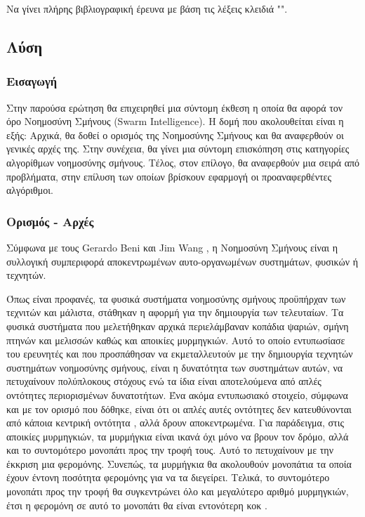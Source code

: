 \documentclass{assignment}
\begin{document}
Να γίνει πλήρης βιβλιογραφική έρευνα με βάση τις λέξεις κλειδιά "".

\subsection {Λύση}
\subsubsection*{Εισαγωγή}
Στην παρούσα ερώτηση θα επιχειρηθεί μια σύντομη έκθεση η οποία θα αφορά τον όρο
Νοημοσύνη Σμήνους (Swarm Intelligence). Η δομή που ακολουθείται είναι η
εξής: Αρχικά, θα δοθεί ο ορισμός της Νοημοσύνης Σμήνους και θα αναφερθούν οι
γενικές αρχές της. Στην συνέχεια, θα γίνει μια σύντομη επισκόπηση στις
κατηγορίες αλγορίθμων νοημοσύνης σμήνους. Τέλος, στον επίλογο, θα αναφερθούν
μια σειρά από προβλήματα, στην επίλυση των οποίων βρίσκουν εφαρμογή οι
προαναφερθέντες αλγόριθμοι.
\subsubsection*{Ορισμός - Αρχές}
Σύμφωνα με τους Gerardo Beni και Jim Wang \cite{beni1993swarm}, η Νοημοσύνη
Σμήνους είναι η συλλογική συμπεριφορά αποκεντρωμένων αυτο-οργανωμένων
συστημάτων, φυσικών ή τεχνητών.

Όπως είναι προφανές, τα φυσικά συστήματα νοημοσύνης σμήνους προϋπήρχαν των
τεχνιτών και μάλιστα, στάθηκαν η αφορμή για την δημιουργία των τελευταίων. Τα
φυσικά συστήματα που μελετήθηκαν αρχικά περιελάμβαναν κοπάδια ψαριών, σμήνη
πτηνών και μελισσών καθώς και αποικίες μυρμηγκιών. Αυτό το οποίο εντυπωσίασε
του ερευνητές και που προσπάθησαν να εκμεταλλευτούν με την δημιουργία τεχνητών
συστημάτων νοημοσύνης σμήνους, είναι η δυνατότητα των συστημάτων αυτών, να
πετυχαίνουν πολύπλοκους στόχους ενώ τα ίδια είναι αποτελούμενα από απλές
οντότητες περιορισμένων δυνατοτήτων. Ένα ακόμα εντυπωσιακό στοιχείο, σύμφωνα
και με τον ορισμό που δόθηκε, είναι ότι οι απλές αυτές οντότητες δεν
κατευθύνονται από κάποια κεντρική οντότητα \cite{ahmed2012swarm}, αλλά δρουν
αποκεντρωμένα. Για παράδειγμα, στις αποικίες μυρμηγκιών, τα μυρμήγκια είναι
ικανά όχι μόνο να βρουν τον δρόμο, αλλά και το συντομότερο μονοπάτι προς την
τροφή τους. Αυτό το πετυχαίνουν με την έκκριση μια φερομόνης. Συνεπώς, τα
μυρμήγκια θα ακολουθούν μονοπάτια τα οποία έχουν έντονη ποσότητα φερομόνης
για να τα διεγείρει. Τελικά, το συντομότερο μονοπάτι προς την τροφή θα
συγκεντρώνει όλο και μεγαλύτερο αριθμό μυρμηγκιών, έτσι η φερομόνη σε αυτό το
μονοπάτι θα είναι εντονότερη κοκ \cite{dorigo2006ant}.
\end{document}
